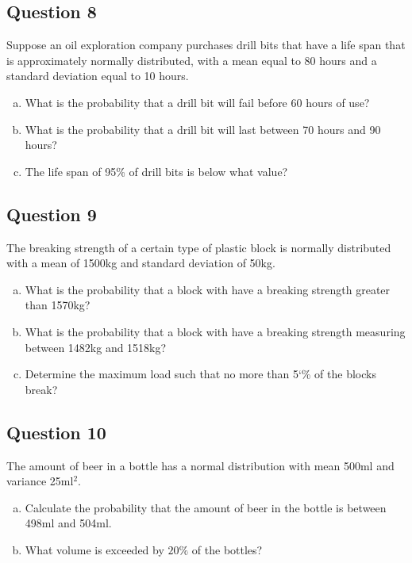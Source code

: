 \documentclass[]{report}
\begin{document}
\begin{enumerate}[(a)]
\begin{enumerate}[(a)]

\subsection*{Question 8}
Suppose an oil exploration company purchases drill bits that have a life span that is approximately normally distributed, with a mean equal to 80 hours and a standard deviation equal to 10 hours.

\begin{enumerate}[(a)]
	\item What is the probability that a drill bit will fail before 60 hours of use?
	
	\item What is the probability that a drill bit will last between 70 hours and 90 hours?
	
	\item The life span of 95\% of drill bits is below what value?
	
\end{enumerate}

\subsection*{Question 9}

The breaking strength of a certain type of plastic block is normally distributed with a
mean of 1500kg and standard deviation of 50kg. 

\begin{enumerate}[(a)]
	\item What is the probability that a block with have a breaking strength greater than 1570kg?
	\item What is the probability that a block with have a breaking strength measuring between 1482kg and 1518kg?
	\item Determine the maximum load such that no more than 5`\% of the blocks break?
\end{enumerate}


\subsection*{Question 10}


The amount of beer in a bottle has a normal distribution with mean 500ml and variance 25ml$^2$.
\begin{enumerate}[(a)]
	\item Calculate the probability that the amount of beer in the bottle is between 498ml and 504ml.
	\item What volume is exceeded by $20\%$ of the bottles? 
	\end{enumerate}


\end{enumerate}
\end{enumerate}
\end{document}
